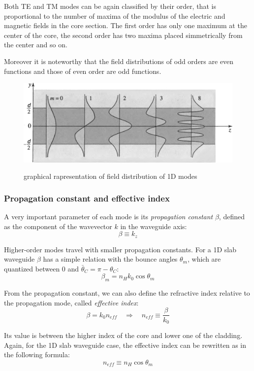 \documentclass[12pt,a4paper,twoside]{article}
\begin{document}
Both TE and TM modes can be again classified by their order, that is proportional to the number of maxima of the modulus of the electric and magnetic fields in the core section.
The first order has only one maximum at the center of the core, the second order has two maxima placed simmetrically from the center and so on.

Moreover it is noteworthy that the field distributions of odd orders are even functions and those of even order are odd functions.

\begin{figure}[ht]
	\centering
	\includegraphics[width=.75\textwidth]{1D_fields.png}
	\label{fig_1dmodes}
	\caption{graphical rapresentation of field distribution of 1D modes}
\end{figure}

\subsubsection*{Propagation constant and effective index}

A very important parameter of each mode is its \textit{propagation constant} $\beta$, defined as the component of the wavevector $k$ in the waveguide axis:
\begin{equation}
\beta \equiv k_z
\end{equation}

Higher-order modes travel with smaller propagation constants.
For a 1D slab waveguide $\beta$ has a simple relation with the bounce angles $\theta_m$, which are quantized between $0$ and $\bar{\theta}_C = \pi - \theta_C$:
$$\beta_m = n_H k_0 \cos \theta_m$$

From the propagation constant, we can also define the refractive index relative to the propagation mode, called \textit{effective index}:
\begin{equation}
\beta = k_0 n_{eff} \quad \Rightarrow \quad n_{eff} \equiv \frac{\beta}{k_0}
\end{equation}

Its value is between the higher index of the core and lower one of the cladding.
Again, for the 1D slab waveguide case, the effective index can be rewritten as in the following formula:
$$ n_{eff} \equiv n_H \cos \theta_m$$
\end{document}
